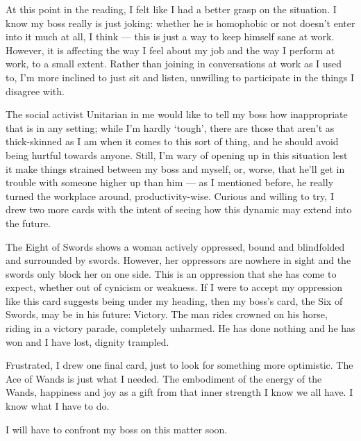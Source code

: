 At this point in the reading, I felt like I had a better grasp on the
situation.  I know my boss really is just joking: whether he is
homophobic or not doesn't enter into it much at all, I think --- this is
just a way to keep himself sane at work.  However, it is affecting the
way I feel about my job and the way I perform at work, to a small
extent.  Rather than joining in conversations at work as I used to, I'm
more inclined to just sit and listen, unwilling to participate in the
things I disagree with.  

The social activist Unitarian in me would like
to tell my boss how inappropriate that is in any setting; while I'm
hardly `tough', there are those that aren't as thick-skinned as I am
when it comes to this sort of thing, and he should avoid being hurtful
towards anyone.  Still, I'm wary of opening up in this situation lest it
make things strained between my boss and myself, or, worse, that he'll
get in trouble with someone higher up than him --- as I mentioned
before, he really turned the workplace around, productivity-wise.
Curious and willing to try, I drew two more cards with the intent of
seeing how this dynamic may extend into the future.

The Eight of Swords shows a woman actively oppressed, bound and
blindfolded and surrounded by swords.  However, her oppressors are
nowhere in sight and the swords only block her on one side.  This is an
oppression that she has come to expect, whether out of cynicism or
weakness.  If I were to accept my oppression like this card suggests
being under my heading, then my boss's card, the Six of Swords, may be
in his future: Victory.  The man rides crowned on his horse, riding in a
victory parade, completely unharmed.  He has done nothing and he has
won and I have lost, dignity trampled.

Frustrated, I drew one final card, just to look for something more
optimistic.  The Ace of Wands is just what I needed.  The embodiment of
the energy of the Wands, happiness and joy as a gift from that inner
strength I know we all have.  I know what I have to do.

I will have to confront my boss on this matter soon.
